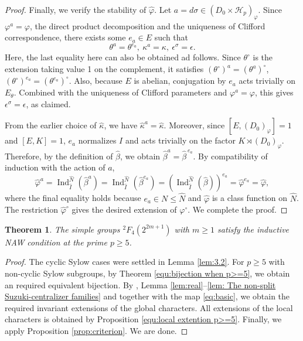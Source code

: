 \documentclass[11pt,a4paper]{article}
\numberwithin{equation}{section}
\newtheorem{theorem}{Theorem}[section]
\theoremstyle{definition}
\theoremstyle{remark}
\newcommand{\HH}{\mathcal H}
\newcommand{\Ind}{\operatorname{Ind}}
\begin{document}
\begin{proof}
Finally, we verify the stability of $\widehat \varphi$.
Let $a=d\sigma\in(D_0\times\HH_p)_\varphi$.
Since $\varphi^a=\varphi$, the direct product decomposition and the uniqueness of Clifford correspondence, there exists some $e_a\in E$ such that
$$
\theta^a=\theta^{e_a},\ \kappa^a=\kappa,\ \epsilon^\sigma=\epsilon.
$$
Here, the last equality here can also be obtained ad follows.
Since  $\theta^\circ$ is the extension taking value 1 on the complement, it satisfies
$(\theta^\circ)^a=(\theta^a)^\circ$, $(\theta^\circ)^{e_a}=(\theta^{e_a})^\circ$.
Also, because $E$ is abelian, conjugation by $e_a$ acts trivially on $E_\theta$. Combined with the uniqueness of Clifford parameters and $\varphi^a=\varphi$, this gives
$\epsilon^\sigma=\epsilon$, as claimed. 

From the earlier choice of \(\widehat\kappa\), we have $\widehat\kappa^a=\widehat\kappa$.
Moreover, since $[E,(D_0)_\varphi]=1$ and $ [E,K]=1$, \(e_a\) normalizes \(I\) and acts trivially on the factor \(K\rtimes (D_0)_\varphi\). Therefore, by the definition of $\widehat \beta$, we obtain $\widehat\beta^a=\widehat\beta^{\,e_a}$.
By compatibility of induction with the action of $a$, 
\[
\widehat\varphi^a
=\Ind_{\widehat I}^{\widehat N}(\widehat\beta^a)
=\Ind_{\widehat I}^{\widehat N}(\widehat\beta^{e_a})
=(\Ind_{\widehat I}^{\widehat N}(\widehat\beta))^{e_a}
=\widehat\varphi^{e_a}
=\widehat \varphi,
\]
where the final equality holds because $e_a\in N \leq {\widehat N}$ and $\widehat \varphi$ is a class function on $\widehat N$. The restriction $\widehat \varphi^\circ$ gives the desired extension of $\varphi^\circ$.  We complete the proof.
\end{proof}

\begin{theorem}\label{thm:2F_4 for p>=5}
The simple groups ${}^2F_4(2^{2m+1})$ with $m\geq 1$  satisfy the inductive NAW condition at the prime $p\geq 5$.
\end{theorem}
\begin{proof}
The cyclic Sylow cases were settled in Lemma \ref{lem:3.2}. For $p\geq5$ with non-cyclic Sylow subgroups, by Theorem \ref{equ:bijection when p>=5}, we obtain an required equivalent bijection. By  \cite[Lemma~10.7(ii)]{FFZ}, Lemma \ref{lem:real}--\ref{lem: The non-split Suzuki-centralizer families} and together with the map \eqref{eq:basic}, we obtain the required invariant extensions of the global characters. All extensions of the local characters is obtained by Proposition \ref{equ:local extention p>=5}. Finally, we apply Proposition \ref{prop:criterion}. We are done.
\end{proof}
\end{document}
